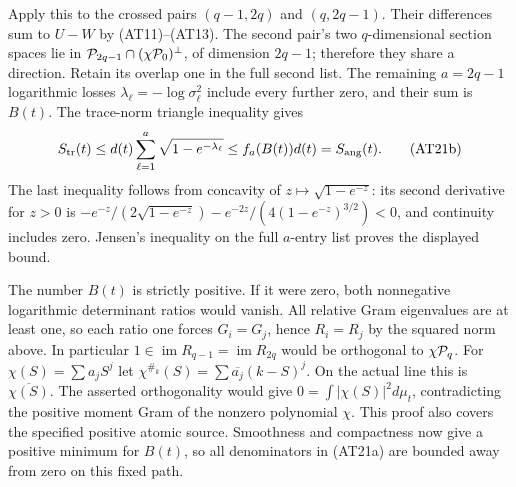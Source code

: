 Apply this to the crossed pairs $(q-1,2q)$ and $(q,2q-1)$.
Their differences sum to $U-W$ by (AT11)--(AT13). The second
pair's two $q$-dimensional section spaces lie in
$\mathcal P_{2q-1}\cap(\chi\mathcal P_0)^\perp$, of dimension $2q-1$;
therefore they share a direction. Retain its overlap one in the
full second list. The remaining $a=2q-1$ logarithmic losses
$\lambda_\ell=-\log\sigma_\ell^2$ include every further zero,
and their sum is $B(t)$. The trace-norm triangle inequality gives
\[
S_{\rm tr}(t)\le d(t)\sum_{\ell=1}^{a}\sqrt{1-e^{-\lambda_\ell}}
 \le f_a(B(t))d(t)=S_{\rm ang}(t).\tag{AT21b}
\]
The last inequality follows from concavity of
$z\mapsto\sqrt{1-e^{-z}}$: its second derivative for $z>0$ is
$-e^{-z}/(2\sqrt{1-e^{-z}})-e^{-2z}/(4(1-e^{-z})^{3/2})<0$,
and continuity includes zero. Jensen's inequality on the full
$a$-entry list proves the displayed bound.

The number $B(t)$ is strictly positive. If it were zero, both
nonnegative logarithmic determinant ratios would vanish. All relative
Gram eigenvalues are at least one, so each ratio one forces
$G_i=G_j$, hence $R_i=R_j$ by the squared norm above. In particular
$1\in\operatorname{im}R_{q-1}=\operatorname{im}R_{2q}$ would be
orthogonal to $\chi\mathcal P_q$. For
$\chi(S)=\sum a_jS^j$ let
$\chi^{\#_k}(S)=\sum\overline{a_j}(k-S)^j$. On the actual line
this is $\overline{\chi(S)}$. The asserted orthogonality would give
$0=\int|\chi(S)|^2d\mu_t$, contradicting the positive moment
Gram of the nonzero polynomial $\chi$. This proof also covers the
specified positive atomic source. Smoothness and compactness now
give a positive minimum for $B(t)$, so all denominators in (AT21a)
are bounded away from zero on this fixed path.

